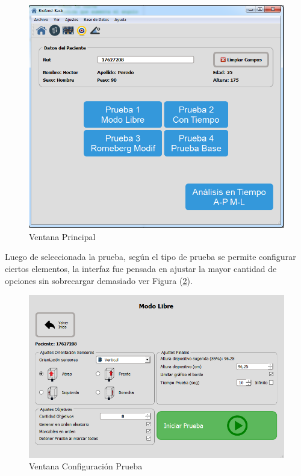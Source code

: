 \documentclass[12pt,a4paper]{article}
\begin{document}
\begin{figure}[H]
	\centering
	\includegraphics[scale=0.6]{images/mainwindow}
	\caption{Ventana Principal}
	\label{fig:mainwindow}
\end{figure}

Luego de seleccionada la prueba, según el tipo de prueba se permite configurar ciertos elementos, la interfaz fue pensada en ajustar la mayor cantidad de opciones sin sobrecargar demasiado ver Figura (\ref{fig:configurarPrueba}).

\begin{figure}[H]
	\centering
	\includegraphics[scale=0.6]{images/configurarPrueba}
	\caption{Ventana Configuración Prueba}
	\label{fig:configurarPrueba}
\end{figure}
\end{document}
